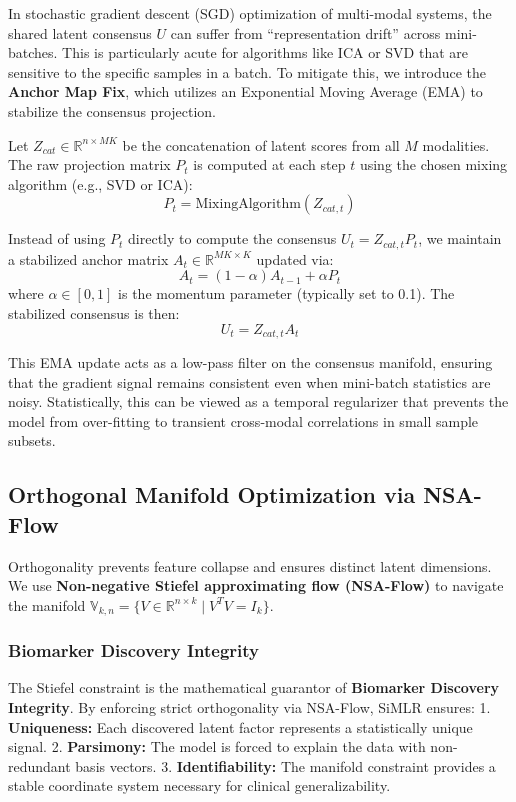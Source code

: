 \documentclass[
  letterpaper,
]{report}
\begin{document}
In stochastic gradient descent (SGD) optimization of multi-modal
systems, the shared latent consensus \(U\) can suffer from
``representation drift'' across mini-batches. This is particularly acute
for algorithms like ICA or SVD that are sensitive to the specific
samples in a batch. To mitigate this, we introduce the \textbf{Anchor
Map Fix}, which utilizes an Exponential Moving Average (EMA) to
stabilize the consensus projection.

Let \(Z_{cat} \in \mathbb{R}^{n \times MK}\) be the concatenation of
latent scores from all \(M\) modalities. The raw projection matrix
\(P_t\) is computed at each step \(t\) using the chosen mixing algorithm
(e.g., SVD or ICA): \[ P_t = \text{MixingAlgorithm}(Z_{cat, t}) \]

Instead of using \(P_t\) directly to compute the consensus
\(U_t = Z_{cat, t} P_t\), we maintain a stabilized anchor matrix
\(A_t \in \mathbb{R}^{MK \times K}\) updated via:
\[ A_t = (1 - \alpha) A_{t-1} + \alpha P_t \] where
\(\alpha \in [0, 1]\) is the momentum parameter (typically set to 0.1).
The stabilized consensus is then: \[ U_t = Z_{cat, t} A_t \]

This EMA update acts as a low-pass filter on the consensus manifold,
ensuring that the gradient signal remains consistent even when
mini-batch statistics are noisy. Statistically, this can be viewed as a
temporal regularizer that prevents the model from over-fitting to
transient cross-modal correlations in small sample subsets.

\subsection{Orthogonal Manifold Optimization via
NSA-Flow}\label{orthogonal-manifold-optimization-via-nsa-flow}

Orthogonality prevents feature collapse and ensures distinct latent
dimensions. We use \textbf{Non-negative Stiefel approximating flow
(NSA-Flow)} to navigate the manifold
\(\mathbb{V}_{k,n} = \{ V \in \mathbb{R}^{n \times k} \mid V^T V = I_k \}\).

\subsubsection{Biomarker Discovery
Integrity}\label{biomarker-discovery-integrity}

The Stiefel constraint is the mathematical guarantor of
\textbf{Biomarker Discovery Integrity}. By enforcing strict
orthogonality via NSA-Flow, SiMLR ensures: 1. \textbf{Uniqueness:} Each
discovered latent factor represents a statistically unique signal. 2.
\textbf{Parsimony:} The model is forced to explain the data with
non-redundant basis vectors. 3. \textbf{Identifiability:} The manifold
constraint provides a stable coordinate system necessary for clinical
generalizability.
\end{document}
